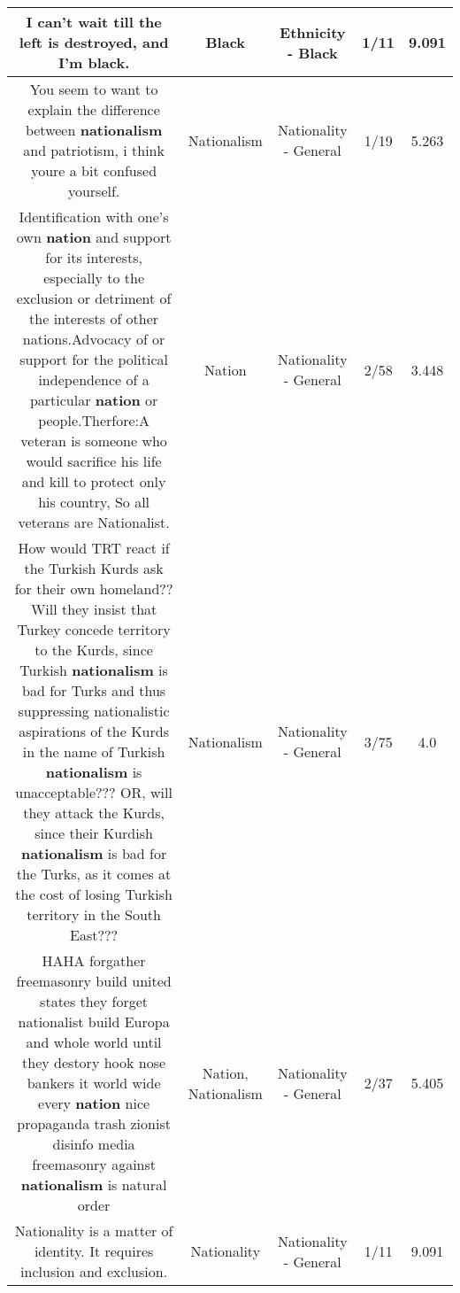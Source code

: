 \documentclass[11pt]{article}
\newlength\mylength
\begin{document}
\begin{center}
\begin{longtable}{|C{.65\mylength}|C{.30\mylength}|C{.12\mylength}|C{.12\mylength}|C{.12\mylength}|}
  \small I can't wait till the left is destroyed, and I'm \textbf{black}.\normalsize   & Black & Ethnicity - Black & 1/11 & 9.091 \\  \hline
  \small You seem to want to explain the difference between \textbf{nationalism} and patriotism, i think youre a bit confused yourself.\normalsize   & Nationalism & Nationality - General & 1/19 & 5.263 \\  \hline
  \small Identification with one's own \textbf{nation} and support for its interests, especially to the exclusion or detriment of the interests of other nations.Advocacy of or support for the political independence of a particular \textbf{nation} or people.Therfore:A veteran is someone who would sacrifice his life and kill to protect only his country, So all veterans are Nationalist.\normalsize   & Nation & Nationality - General & 2/58 & 3.448 \\  \hline
  \small How would TRT react if the Turkish Kurds ask for their own homeland??  Will they insist that Turkey concede territory to the Kurds, since Turkish \textbf{nationalism} is bad for Turks and thus suppressing nationalistic aspirations of the Kurds in the name of Turkish \textbf{nationalism} is unacceptable??? OR, will they attack the Kurds, since their Kurdish \textbf{nationalism} is bad for the Turks, as it comes at the cost of losing Turkish territory in the South East???\normalsize   & Nationalism & Nationality - General & 3/75 & 4.0 \\  \hline
  \small HAHA  forgather freemasonry build united states they forget nationalist build Europa and whole world until they destory hook nose bankers it world wide every \textbf{nation}  nice propaganda trash  zionist  disinfo media  freemasonry  against \textbf{nationalism} is natural order\normalsize   & Nation, Nationalism & Nationality - General & 2/37 & 5.405 \\  \hline
  \small Nationality is a matter of identity. It requires inclusion and exclusion.\normalsize   & Nationality & Nationality - General & 1/11 & 9.091 \\  \hline

\end{longtable}
\end{center}
\end{document}

